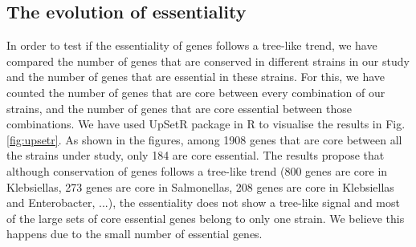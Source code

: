 \documentclass[12pt,letterpaper]{article}
\begin{document}
\subsection{The evolution of essentiality}
%

In order to test if the essentiality of genes follows a tree-like trend, we have compared the number of genes that are conserved in different strains in our study and the number of genes that are essential in these strains. For this, we have counted the number of genes that are core between every combination of our strains, and the number of genes that are core essential between those combinations. We have used UpSetR package \cite{conway_upsetr:_2016} in R to visualise the results in Fig.\@ \ref{fig:upsetr}. As shown in the figures, among 1908 genes that are core between all the strains under study, only 184 are core essential. The results propose that although conservation of genes follows a tree-like trend (800 genes are core in Klebsiellas, 273 genes are core in Salmonellas, 208 genes are core in Klebsiellas and Enterobacter, ...), the essentiality does not show a tree-like signal and most of the large sets of core essential genes belong to only one strain. We believe this happens due to the small number of essential genes.
\end{document}
